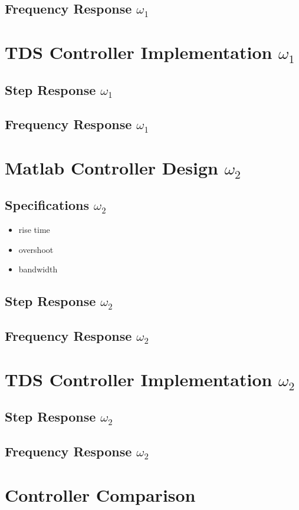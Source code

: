 \documentclass[11pt,titlepage]{article}
\begin{document}
	\subsection{Frequency Response $\omega_1$}

\section{TDS Controller Implementation $\omega_1$}

	\subsection{Step Response $\omega_1$}

	\subsection{Frequency Response $\omega_1$}

\section{Matlab Controller Design $\omega_2$}
	
	\subsection{Specifications $\omega_2$}
		\begin{itemize}
			\item rise time
			\item overshoot
			\item bandwidth
		\end{itemize}

	\subsection{Step Response $\omega_2$}

	\subsection{Frequency Response $\omega_2$}

\section{TDS Controller Implementation $\omega_2$}

	\subsection{Step Response $\omega_2$}

	\subsection{Frequency Response $\omega_2$}

\section{Controller Comparison}
\end{document}
